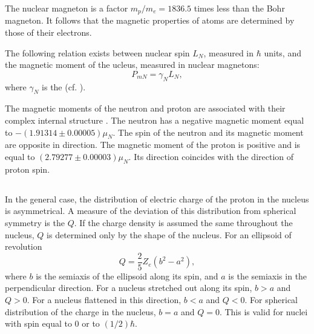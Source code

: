 The nuclear magneton is a factor $m_{p}/m_{e} = 1836.5$ times less than the Bohr magneton. It follows that the magnetic properties of atoms are determined by those of their electrons.

The following relation exists between nuclear spin $L_{N}$, measured in $\hbar$ units, and the magnetic moment of the  ucleus, measured in nuclear magnetons:
\begin{equation*}%
P_{mN} = \gamma_{N} L_{N},
\end{equation*}
where $\gamma_{N}$ is the  (cf. ).

The magnetic moments of the neutron and proton are associated with their complex internal structure . The neutron has a negative magnetic moment equal to $-(1.91314 \pm 0.00005) \mu_{N}$. The spin of the neutron and its magnetic moment are opposite in direction. The magnetic moment of the proton is positive and is equal to $(2.79277 \pm 0.00003) \mu_{N}$. Its direction coincides with the direction of proton spin.


\subsection{}\label{42.1.7}

In the general case, the distribution of electric charge
of the proton in the nucleus is asymmetrical. A measure of the deviation of this distribution from spherical symmetry is the  $Q$. If the charge density is assumed the same throughout the nucleus, $Q$ is determined only by the shape of the nucleus. For an ellipsoid of revolution
\begin{equation*}%
Q = \frac{2}{5} Z_{e} (b^{2} - a^{2}),
\end{equation*}
where $b$ is the semiaxis of the ellipsoid along its spin, and $a$ is the semiaxis in the perpendicular direction. For a nucleus stretched out along its spin, $b > a$ and $Q > 0$. For a nucleus flattened in this direction, $b < a$ and $Q < 0$. For spherical distribution of the charge in the nucleus, $b = a$ and $Q = 0$. This is valid for nuclei with spin equal to 0 or to $(1/2) \hbar$.

